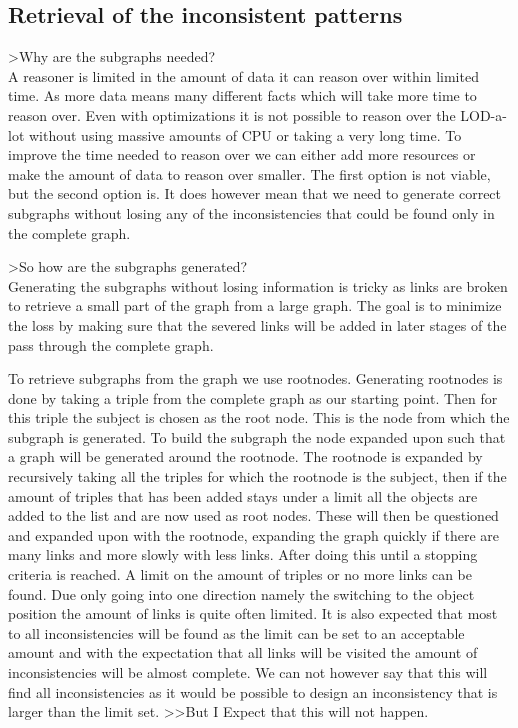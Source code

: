 \documentclass{article}
\begin{document}
\subsection{Retrieval of the inconsistent patterns}
>Why are the subgraphs needed?\\

A reasoner is limited in the amount of data it can reason over within limited time. As more data means many different facts which will take more time to reason over. Even with optimizations it is not possible to reason over the LOD-a-lot without using massive amounts of CPU or taking a very long time. To improve the time needed to reason over we can either add more resources or make the amount of data to reason over smaller. The first option is not viable, but the second option is. 
It does however mean that we need to generate correct subgraphs without losing any of the inconsistencies that could be found only in the complete graph.

>So how are the subgraphs generated?\\

Generating the subgraphs without losing information is tricky as links are broken to retrieve a small part of the graph from a large graph. The goal is to minimize the loss by making sure that the severed links will be added in later stages of the pass through the complete graph.

To retrieve subgraphs from the graph we use rootnodes. Generating rootnodes is done by taking a triple from the complete graph as our starting point. Then for this triple the subject is chosen as the root node. This is the node from which the subgraph is generated. To build the subgraph the node expanded upon such that a graph will be generated around the rootnode. 
The rootnode is expanded by recursively taking all the triples for which the rootnode is the subject, then if the amount of triples that has been added stays under a limit all the objects are added to the list and are now used as root nodes. These will then be questioned and expanded upon with the rootnode, expanding the graph quickly if there are many links and more slowly with less links. After doing this until a stopping criteria is reached. A limit on the amount of triples or no more links can be found. Due only going into one direction namely the switching to the object position the amount of links is quite often limited. 
It is also expected that most to all inconsistencies will be found as the limit can be set to an acceptable amount and with the expectation that all links will be visited the amount of inconsistencies will be almost complete. We can not however say that this will find all inconsistencies as it would be possible to design an inconsistency that is larger than the limit set. >>But I Expect that this will not happen.
\end{document}
